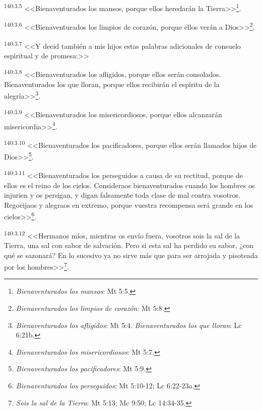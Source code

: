 \par 
\textsuperscript{140:3.5} <<Bienaventurados los mansos, porque ellos heredarán la Tierra>>\footnote{\textit{Bienaventurados los mansos}: Mt 5:5.}.

\par 
\textsuperscript{140:3.6} <<Bienaventurados los limpios de corazón, porque ellos verán a Dios>>\footnote{\textit{Bienaventurados los limpios de corazón}: Mt 5:8.}.

\par 
\textsuperscript{140:3.7} <<Y decid también a mis hijos estas palabras adicionales de consuelo espiritual y de promesa:>>

\par 
\textsuperscript{140:3.8} <<Bienaventurados los afligidos, porque ellos serán consolados. Bienaventurados los que lloran, porque ellos recibirán el espíritu de la alegría>>\footnote{\textit{Bienaventurados los afligidos}: Mt 5:4. \textit{Bienaventurados los que lloran}: Lc 6:21b.}.

\par 
\textsuperscript{140:3.9} <<Bienaventurados los misericordiosos, porque ellos alcanzarán misericordia>>\footnote{\textit{Bienaventurados los misericordiosos}: Mt 5:7.}.

\par 
\textsuperscript{140:3.10} <<Bienaventurados los pacificadores, porque ellos serán llamados hijos de Dios>>\footnote{\textit{Bienaventurados los pacificadores}: Mt 5:9.}.

\par 
\textsuperscript{140:3.11} <<Bienaventurados los perseguidos a causa de su rectitud, porque de ellos es el reino de los cielos. Consideraos bienaventurados cuando los hombres os injurien y os persigan, y digan falsamente toda clase de mal contra vosotros. Regocijaos y alegraos en extremo, porque vuestra recompensa será grande en los cielos>>\footnote{\textit{Bienaventurados los perseguidos}: Mt 5:10-12; Lc 6:22-23a.}.

\par 
\textsuperscript{140:3.12} <<Hermanos míos, mientras os envío fuera, vosotros sois la sal de la Tierra, una sal con sabor de salvación. Pero si esta sal ha perdido su sabor, ¿con qué se sazonará? En lo sucesivo ya no sirve más que para ser arrojada y pisoteada por los hombres>>\footnote{\textit{Sois la sal de la Tierra}: Mt 5:13; Mc 9:50; Lc 14:34-35.}.

